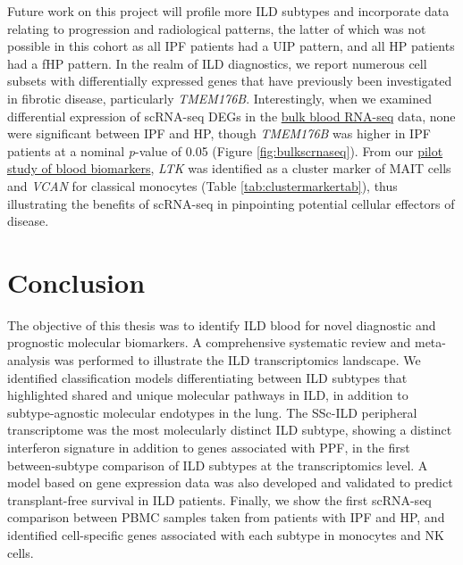 \documentclass[
]{article}
\begin{document}
Future work on this project will profile more ILD subtypes and incorporate data relating to progression and radiological patterns, the latter of which was not possible in this cohort as all IPF patients had a UIP pattern, and all HP patients had a fHP pattern. In the realm of ILD diagnostics, we report numerous cell subsets with differentially expressed genes that have previously been investigated in fibrotic disease, particularly \textit{TMEM176B}. Interestingly, when we examined differential expression of scRNA-seq DEGs in the \hyperref[bloodrnaseq]{bulk blood RNA-seq} data, none were significant between IPF and HP, though \textit{TMEM176B} was higher in IPF patients at a nominal \textit{p}-value of 0.05 (Figure \ref{fig:bulkscrnaseq}). From our \hyperref[bloodpilot]{pilot study of blood biomarkers}, \textit{LTK} was identified as a cluster marker of MAIT cells and \textit{VCAN} for classical monocytes (Table \ref{tab:clustermarkertab}), thus illustrating the benefits of scRNA-seq in pinpointing potential cellular effectors of disease.

\clearpage

\section{Conclusion}\label{conclusion}

The objective of this thesis was to identify ILD blood for novel diagnostic and prognostic molecular biomarkers. A comprehensive systematic review and meta-analysis was performed to illustrate the ILD transcriptomics landscape. We identified classification models differentiating between ILD subtypes that highlighted shared and unique molecular pathways in ILD, in addition to subtype-agnostic molecular endotypes in the lung. The SSc-ILD peripheral transcriptome was the most molecularly distinct ILD subtype, showing a distinct interferon signature in addition to genes associated with PPF, in the first between-subtype comparison of ILD subtypes at the transcriptomics level. A model based on gene expression data was also developed and validated to predict transplant-free survival in ILD patients. Finally, we show the first scRNA-seq comparison between PBMC samples taken from patients with IPF and HP, and identified cell-specific genes associated with each subtype in monocytes and NK cells.
\end{document}
